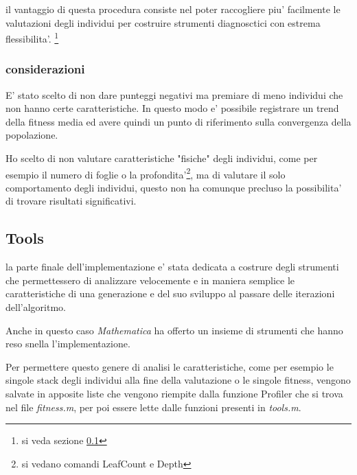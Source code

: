 \documentclass[12pt, a4paper]{article}
\begin{document}
il vantaggio di questa procedura consiste nel poter raccogliere piu' facilmente le valutazioni degli individui per costruire strumenti diagnosctici con estrema flessibilita'.
\footnote{si veda sezione \ref{sec:tools} }

\subsubsection{considerazioni}
E' stato scelto di non dare punteggi negativi ma premiare di meno individui che non hanno certe caratteristiche. In questo modo e' possibile registrare un trend della fitness media ed avere quindi un punto di riferimento sulla convergenza della popolazione.

Ho scelto di non valutare caratteristiche "fisiche" degli individui, come per esempio il numero di foglie o la profondita'\footnote{si vedano comandi LeafCount e Depth}, ma di valutare il solo comportamento degli individui, questo non ha comunque precluso la possibilita' di trovare risultati significativi.

\subsection{Tools}
\label{sec:tools}
la parte finale dell'implementazione e' stata dedicata a costrure degli strumenti che permettessero di analizzare velocemente e in maniera semplice le caratteristiche di una generazione e del suo sviluppo al passare delle iterazioni dell'algoritmo.

Anche in questo caso {\itshape Mathematica} ha offerto un insieme di strumenti che hanno reso snella l'implementazione.

Per permettere questo genere di analisi le caratteristiche, come per esempio le singole stack degli individui alla fine della valutazione o le singole fitness, vengono salvate in apposite liste che vengono riempite dalla funzione Profiler che si trova nel file {\itshape fitness.m}, per poi essere lette dalle funzioni presenti in {\itshape tools.m}.
\end{document}
